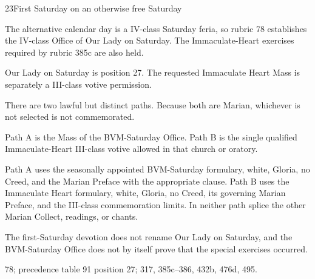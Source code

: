 \begin{casefile}{23}{First Saturday on an otherwise free Saturday}
\item[Calendar facts] The alternative calendar day is a IV-class Saturday feria, so rubric 78 establishes the IV-class Office of Our Lady on Saturday.  The Immaculate-Heart exercises required by rubric 385c are also held.
\item[Ranks and rows] Our Lady on Saturday is position 27.  The requested Immaculate Heart Mass is separately a III-class votive permission.
\item[Impeded item] There are two lawful but distinct paths.  Because both are Marian, whichever is not selected is not commemorated.
\item[Mass category] Path A is the Mass of the BVM-Saturday Office.  Path B is the single qualified Immaculate-Heart III-class votive allowed in that church or oratory.
\item[Assembly] Path A uses the seasonally appointed BVM-Saturday formulary, white, Gloria, no Creed, and the Marian Preface with the appropriate clause.  Path B uses the Immaculate Heart formulary, white, Gloria, no Creed, its governing Marian Preface, and the III-class commemoration limits.  In neither path splice the other Marian Collect, readings, or chants.
\item[Boundary] The first-Saturday devotion does not rename Our Lady on Saturday, and the BVM-Saturday Office does not by itself prove that the special exercises occurred.
\item[Rubric locus] 78; precedence table 91 position 27; 317, 385c--386, 432b, 476d, 495.
\end{casefile}

